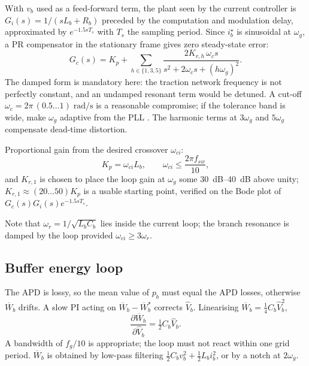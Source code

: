 \documentclass[11pt,a4paper]{article}
\begin{document}
With $v_b$ used as a feed-forward term, the plant seen by the current controller
is $G_i(s) = 1/(sL_b+R_b)$ preceded by the computation and modulation delay,
approximated by $e^{-1.5 s T_s}$ with $T_s$ the sampling period. Since
$i_b^\star$ is sinusoidal at $\omega_g$, a PR compensator in the stationary
frame gives zero steady-state error:
\begin{equation}
G_c(s) = K_p + \sum_{h\in\{1,3,5\}} \frac{2K_{r,h}\,\omega_c s}{s^2 + 2\omega_c s + (h\omega_g)^2}.
\label{eq:PR}
\end{equation}
The damped form is mandatory here: the traction network frequency is not
perfectly constant, and an undamped resonant term would be detuned. A cut-off
$\omega_c = 2\pi\,(0.5\ldots1)\;\si{\radian\per\second}$ is a reasonable
compromise; if the tolerance band is wide, make $\omega_g$ adaptive from the PLL
\cite{teodorescu2006pr}. The harmonic terms at $3\omega_g$ and $5\omega_g$
compensate dead-time distortion.

Proportional gain from the desired crossover $\omega_{ci}$:
\begin{equation}
K_p = \omega_{ci} L_b, \qquad \omega_{ci} \le \frac{2\pi f_{sw}}{10},
\end{equation}
and $K_{r,1}$ is chosen to place the loop gain at $\omega_g$ some
\SIrange{30}{40}{\deci\bel} above unity; $K_{r,1}\approx(20\ldots50)K_p$ is a
usable starting point, verified on the Bode plot of
$G_c(s)G_i(s)e^{-1.5sT_s}$.

Note that $\omega_r=1/\sqrt{L_bC_b}$ lies inside the current loop; the branch
resonance is damped by the loop provided $\omega_{ci}\ge 3\omega_r$.

\subsection{Buffer energy loop}

The APD is lossy, so the mean value of $p_b$ must equal the APD losses,
otherwise $\overline{W}_b$ drifts. A slow PI acting on
$\overline{W}_b - \overline{W}_b^\star$ corrects $\hat V_b$. Linearising
$\overline{W}_b = \tfrac14 C_b \hat V_b^2$,
\begin{equation}
\frac{\partial \overline{W}_b}{\partial \hat V_b} = \tfrac12 C_b\hat V_b .
\end{equation}
A bandwidth of $f_g/10$ is appropriate; the loop must not react within one grid
period. $\overline{W}_b$ is obtained by low-pass filtering
$\tfrac12 C_b v_b^2 + \tfrac12 L_b i_b^2$, or by a notch at $2\omega_g$.
\end{document}
